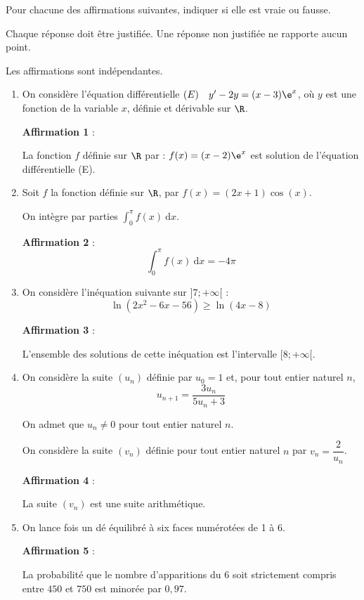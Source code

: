 Pour chacune des affirmations suivantes, indiquer si elle est vraie ou fausse.

Chaque réponse doit être justifiée. Une réponse non justifiée ne rapporte aucun point.

Les affirmations sont indépendantes.

\medskip

\begin{enumerate}
	\item On considère l'équation différentielle \quad $(E)\quad y' - 2y = (x- 3)\e^x$,
	\quad
	où $y$ est une fonction de la variable $x$, définie et dérivable sur $\R$.

	\textbf{Affirmation 1} :

	La fonction $f$ définie sur $\R$ par : $f(x) = (x - 2)\e^x$ est solution de l'équation différentielle (E).

	\item Soit $f$ la fonction définie sur $\R$, par \quad $f(x) = (2x + 1) \cos (x)$.

	On intègre par parties $\displaystyle\int_0^{\pi} f(x)\:\text{d}x$.

	\textbf{Affirmation 2} :
	\[\displaystyle\int_0^{\pi} f(x)\:\text{d}x =  - 4\pi\]

	\item On considère l'inéquation suivante sur $]7 ; +\infty[$ :
	\[\ln \left(2x^2 - 6x - 56\right) \geqslant \ln(4x - 8)\]

	\textbf{Affirmation 3} :

	L'ensemble des solutions de cette inéquation est l'intervalle $[8 ; +\infty[$.

	\item On considère la suite $(u_n)$ définie par $u_0 = 1$ et, pour tout entier naturel $n$,
	\[u_{n+1} = \dfrac{ 3u_n}{5u_n + 3}\]

	On admet que $u_n \ne 0$ pour tout entier naturel $n$.

	On considère la suite $(v_n)$ définie pour tout entier naturel $n$ par \quad $v_n = \dfrac{2}{u_n}$.

	\textbf{Affirmation 4} :

	La suite $(v_n)$ est une suite arithmétique.
	\item On lance  fois un dé équilibré à six faces numérotées de 1 à 6.

	\textbf{Affirmation 5} :

	La probabilité que le nombre d'apparitions du 6 soit strictement compris entre $450$ et $750$ est minorée par $0,97$.
\end{enumerate}

